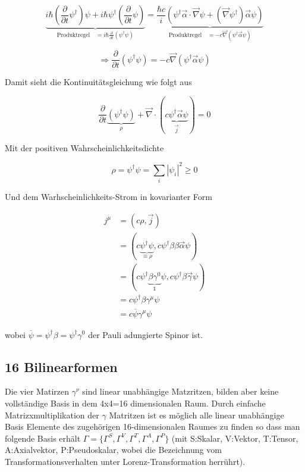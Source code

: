 \begin{equation}
  \label{eq:21}
  \underbrace{ i\hbar(\frac{\partial}{\partial t} \psi^\dagger)\psi+i\hbar\psi^\dagger (\frac{\partial}{\partial t} \psi)}_{\text{Produktregel} \quad = i\hbar\frac{\partial}{\partial t} (\psi^\dagger\psi) } =\underbrace{\frac{\hbar c}{i}(\psi^\dagger \vec \alpha\cdot\vec\nabla\psi+(\vec\nabla\psi^\dagger)\vec\alpha \psi)}_{\text{Produktregel} \quad = -c\vec\nabla(\psi^\dagger\vec\alpha\psi)}
\end{equation}


\[\Rightarrow \frac{\partial}{\partial t}(\psi^\dagger\psi) = -c\vec\nabla(\psi^\dagger\vec\alpha\psi)\]

Damit sieht die Kontinuitätsgleichung wie folgt aus


\begin{equation}
  \label{eq:22}
  \boxed{ \frac{\partial}{\partial t}\underbrace{(\psi^\dagger\psi) }_{\rho}+\vec\nabla\cdot(\underbrace{c\psi^\dagger\vec\alpha\psi }_{\vec j})=0 }
\end{equation}

Mit der positiven Wahrscheinlichkeitsdichte


\begin{equation}
  \label{eq:23}
  \rho =\psi^\dagger\psi = \sum_i|\psi_i|^2\geq 0
\end{equation}

Und dem Warhscheinlichkeits-Strom in kovarianter Form

\begin{align}
j^\mu &= (c\rho ,\vec j )\\
&= (c\underbrace{\psi^\dagger\psi}_{\equiv \rho} ,c\psi^\dagger\beta\beta\vec\alpha\psi )\\
&= (c\psi^\dagger\underbrace{\beta\gamma^0}_{\mathbb 1}\psi ,c\psi^\dagger\beta\vec\gamma\psi )\\
&= c\psi^\dagger \beta\gamma^\mu \psi\\
&= c\overline \psi\gamma^\mu \psi
\end{align}

wobei \(\overline \psi = \psi^\dagger\beta=\psi^\dagger\gamma^0\) der Pauli adungierte Spinor ist.


\subsection*{16 Bilinearformen}

Die vier Matirzen \(\gamma^\nu\) sind linear unabhängige Matzritzen, bilden aber keine vollständige Basis in dem 4x4=16 dimensionalen Raum. Durch einfache Matrizxmultiplikation der \(\gamma\) Matritzen  ist es möglich alle linear unabhängige Basis Elemente des zugehörigen 16-dimensionalen Raumes zu finden so dass man folgende Basis erhält \(\Gamma = \{\Gamma^S, \Gamma^V, \Gamma^T, \Gamma^A, \Gamma^P\}\) (mit S:Skalar, V:Vektor, T:Tensor, A:Axialvektor, P:Pseudoskalar, wobei die Bezeichnung vom Transformationsverhalten unter Lorenz-Transformation herrührt). 


